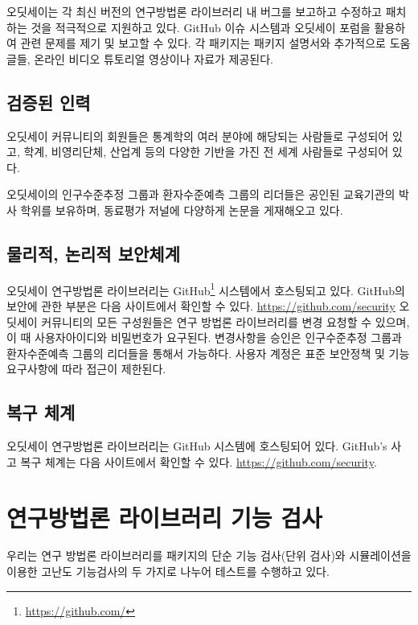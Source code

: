 \documentclass[11pt]{book}
\let\rmarkdownfootnote\footnote%
\def\footnote{\protect\rmarkdownfootnote}
\theoremstyle{definition}
\theoremstyle{definition}
\theoremstyle{definition}
\theoremstyle{remark}
\begin{document}
오딧세이는 각 최신 버전의 연구방법론 라이브러리 내 버그를 보고하고
수정하고 패치하는 것을 적극적으로 지원하고 있다. GitHub 이슈 시스템과
오딧세이 포럼을 활용하여 관련 문제를 제기 및 보고할 수 있다. 각 패키지는
패키지 설명서와 추가적으로 도움글들, 온라인 비디오 튜토리얼 영상이나
자료가 제공된다.

\subsection{검증된 인력}\label{-}

오딧세이 커뮤니티의 회원들은 통계학의 여러 분야에 해당되는 사람들로
구성되어 있고, 학계, 비영리단체, 산업계 등의 다양한 기반을 가진 전 세계
사람들로 구성되어 있다.

오딧세이의 인구수준추정 그룹과 환자수준예측 그룹의 리더들은 공인된
교육기관의 박사 학위를 보유하며, 동료평가 저널에 다양하게 논문을
게재해오고 있다.

\subsection{물리적, 논리적 보안체계}\label{--}

오딧세이 연구방법론 라이브러리는 GitHub\footnote{\url{https://github.com/}}
시스템에서 호스팅되고 있다. GitHub의 보안에 관한 부분은 다음 사이트에서
확인할 수 있다. \url{https://github.com/security} 오딧세이 커뮤니티의
모든 구성원들은 연구 방법론 라이브러리를 변경 요청할 수 있으며, 이 때
사용자아이디와 비밀번호가 요구된다. 변경사항을 승인은 인구수준추정
그룹과 환자수준예측 그룹의 리더들을 통해서 가능하다. 사용자 계정은 표준
보안정책 및 기능 요구사항에 따라 접근이 제한된다.

\subsection{복구 체계}\label{-}

오딧세이 연구방법론 라이브러리는 GitHub 시스템에 호스팅되어 있다.
GitHub's 사고 복구 체계는 다음 사이트에서 확인할 수 있다.
\url{https://github.com/security}.

\section{연구방법론 라이브러리 기능 검사}\label{---}

우리는 연구 방법론 라이브러리를 패키지의 단순 기능 검사(단위 검사)와
시뮬레이션을 이용한 고난도 기능검사의 두 가지로 나누어 테스트를 수행하고
있다.
\end{document}
